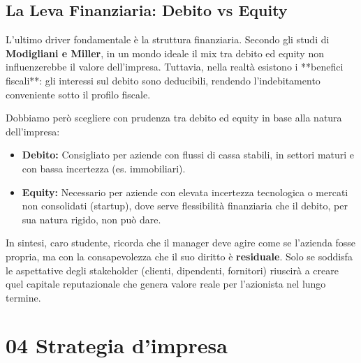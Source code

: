 \documentclass[a4paper,10pt]{article}
\begin{document}
\subsection*{La Leva Finanziaria: Debito vs Equity}

L'ultimo driver fondamentale è la struttura finanziaria. Secondo gli studi di \textbf{Modigliani e Miller}, in un mondo ideale il mix tra debito ed equity non influenzerebbe il valore dell'impresa. Tuttavia, nella realtà esistono i **benefici fiscali**: gli interessi sul debito sono deducibili, rendendo l'indebitamento conveniente sotto il profilo fiscale.

Dobbiamo però scegliere con prudenza tra debito ed equity in base alla natura dell'impresa:
\begin{itemize}
    \item \textbf{Debito:} Consigliato per aziende con flussi di cassa stabili, in settori maturi e con bassa incertezza (es. immobiliari).
    \item \textbf{Equity:} Necessario per aziende con elevata incertezza tecnologica o mercati non consolidati (startup), dove serve flessibilità finanziaria che il debito, per sua natura rigido, non può dare.
\end{itemize}

In sintesi, caro studente, ricorda che il manager deve agire come se l'azienda fosse propria, ma con la consapevolezza che il suo diritto è \textbf{residuale}. Solo se soddisfa le aspettative degli stakeholder (clienti, dipendenti, fornitori) riuscirà a creare quel capitale reputazionale che genera valore reale per l'azionista nel lungo termine.
\section*{04 Strategia d'impresa}
\end{document}
